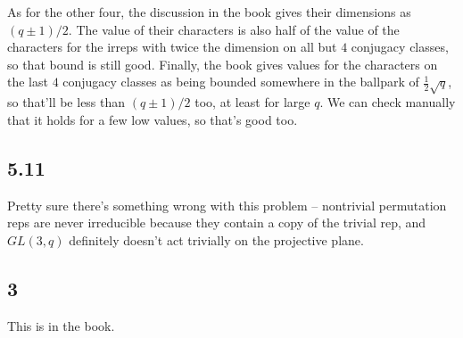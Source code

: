 \documentclass{article}
\begin{document}
As for the other four, the discussion in the book gives their dimensions as $(q\pm1)/2$. The value of their characters is also half of the value of the characters for the irreps with twice the dimension on all but $4$ conjugacy classes, so that bound is still good. Finally, the book gives values for the characters on the last $4$ conjugacy classes as being bounded somewhere in the ballpark of $\frac{1}{2}\sqrt{q}$, so that'll be less than $(q\pm1)/2$ too, at least for large $q$. We can check manually that it holds for a few low values, so that's good too.
\subsection*{5.11}
Pretty sure there's something wrong with this problem -- nontrivial permutation reps are never irreducible because they contain a copy of the trivial rep, and $GL(3,q)$ definitely doesn't act trivially on the projective plane.
\subsection*{3}
%
%
%
%
%
This is in the book.
\end{document}
